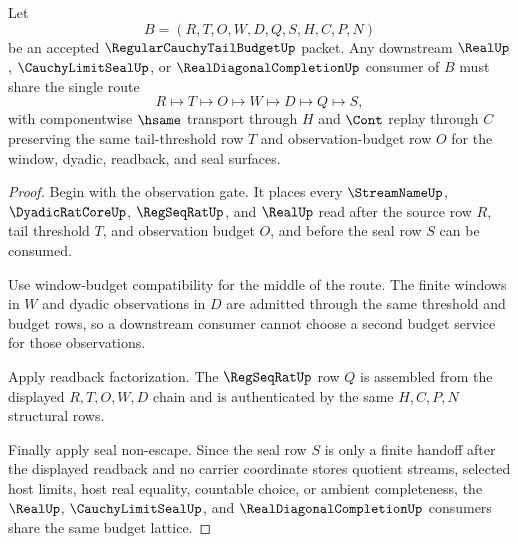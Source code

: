 \begin{theorem}
\label{thm:regular-cauchy-tail-budget-downstream-budget-lattice}
Let
$$
B=(R,T,O,W,D,Q,S,H,C,P,N)
$$
be an accepted $\RegularCauchyTailBudgetUp$ packet. Any downstream $\RealUp$, $\CauchyLimitSealUp$, or $\RealDiagonalCompletionUp$ consumer of $B$ must share the single route
$$
R \longmapsto T \longmapsto O \longmapsto W \longmapsto D \longmapsto Q \longmapsto S,
$$
with componentwise $\hsame$ transport through $H$ and $\Cont$ replay through $C$ preserving the same tail-threshold row $T$ and observation-budget row $O$ for the window, dyadic, readback, and seal surfaces.
\end{theorem}
\begin{proof}
Begin with the observation gate. It places every $\StreamNameUp$, $\DyadicRatCoreUp$, $\RegSeqRatUp$, and $\RealUp$ read after the source row $R$, tail threshold $T$, and observation budget $O$, and before the seal row $S$ can be consumed.

Use window-budget compatibility for the middle of the route. The finite windows in $W$ and dyadic observations in $D$ are admitted through the same threshold and budget rows, so a downstream consumer cannot choose a second budget service for those observations.

Apply readback factorization. The $\RegSeqRatUp$ row $Q$ is assembled from the displayed $R,T,O,W,D$ chain and is authenticated by the same $H,C,P,N$ structural rows.

Finally apply seal non-escape. Since the seal row $S$ is only a finite handoff after the displayed readback and no carrier coordinate stores quotient streams, selected host limits, host real equality, countable choice, or ambient completeness, the $\RealUp$, $\CauchyLimitSealUp$, and $\RealDiagonalCompletionUp$ consumers share the same budget lattice.
\end{proof}

